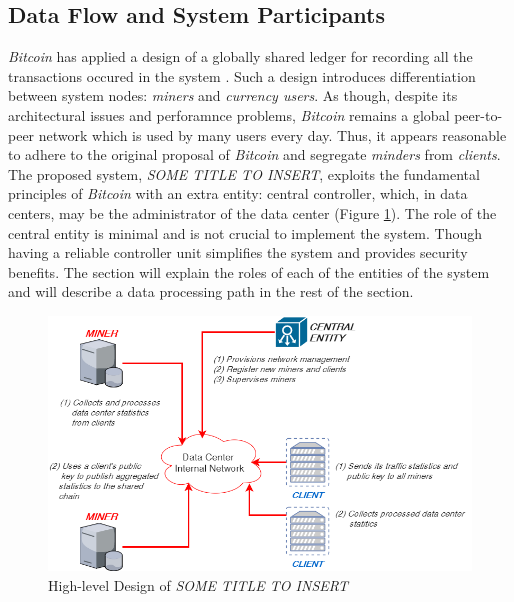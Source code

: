 \documentclass{article}
\newcommand{\projTitle}{SOME TITLE TO INSERT}
\begin{document}
\subsection{Data Flow and System Participants}
 \textit{Bitcoin} has applied a design of a globally shared ledger for recording all the transactions occured in the system \cite{bitcoin_paper}. Such a design introduces differentiation between system nodes: \textit{miners} and \textit{currency users}. As though, despite its architectural issues and perforamnce problems, \textit{Bitcoin} remains a global peer-to-peer network which is used by many users every day. Thus, it appears reasonable to adhere to the original proposal of \textit{Bitcoin} and segregate \textit{minders} from \textit{clients}. The proposed system, \textit{\projTitle}, exploits the fundamental principles of \textit{Bitcoin} with an extra entity: central controller, which, in data centers, may be the administrator of the data center (Figure \ref{fig:project_design}). The role of the central entity is minimal and is not crucial to implement the system. Though having a reliable controller unit simplifies the system and provides security benefits. The section will explain the roles of each of the entities of the system and will describe a data processing path in the rest of the section.
   
\begin{figure}[h!]
  \includegraphics[width=0.6\linewidth]{figures/project_design.png}
  \caption{High-level Design of \textit{\projTitle}}
  \label{fig:project_design}
\end{figure}
\end{document}
